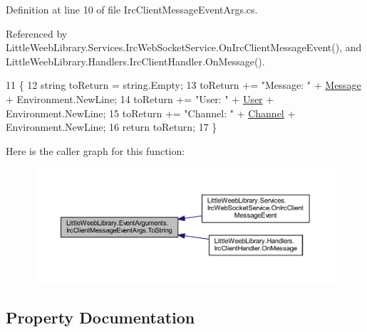 Definition at line 10 of file Irc\+Client\+Message\+Event\+Args.\+cs.



Referenced by Little\+Weeb\+Library.\+Services.\+Irc\+Web\+Socket\+Service.\+On\+Irc\+Client\+Message\+Event(), and Little\+Weeb\+Library.\+Handlers.\+Irc\+Client\+Handler.\+On\+Message().


\begin{DoxyCode}
11         \{
12             \textcolor{keywordtype}{string} toReturn = \textcolor{keywordtype}{string}.Empty;
13             toReturn += \textcolor{stringliteral}{"Message: "} + \mbox{\hyperlink{class_little_weeb_library_1_1_event_arguments_1_1_irc_client_message_event_args_a00af672ceae9da43c1bcff12049fd78d}{Message}} + Environment.NewLine;
14             toReturn += \textcolor{stringliteral}{"User: "} + \mbox{\hyperlink{class_little_weeb_library_1_1_event_arguments_1_1_irc_client_message_event_args_a93a50eb157a99b2b315ecb2439cc64db}{User}} + Environment.NewLine;
15             toReturn += \textcolor{stringliteral}{"Channel: "} + \mbox{\hyperlink{class_little_weeb_library_1_1_event_arguments_1_1_irc_client_message_event_args_a89968e57254aa26cf1d41fa7a967ec61}{Channel}} + Environment.NewLine;
16             \textcolor{keywordflow}{return} toReturn;
17         \}
\end{DoxyCode}
Here is the caller graph for this function\+:\nopagebreak
\begin{figure}[H]
\begin{center}
\leavevmode
\includegraphics[width=350pt]{class_little_weeb_library_1_1_event_arguments_1_1_irc_client_message_event_args_a0b8df2a044d27dec2dd963e978311be4_icgraph}
\end{center}
\end{figure}


\subsection{Property Documentation}
\mbox{\label{class_little_weeb_library_1_1_event_arguments_1_1_irc_client_message_event_args_a00af672ceae9da43c1bcff12049fd78d}} 
